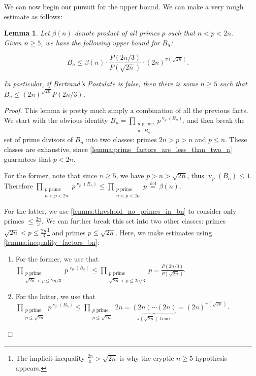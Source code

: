 \documentclass[11pt]{article}
\newtheorem{lemma}[theorem]{Lemma}
\theoremstyle{remark}
\newcommand{\vs}{\vspace{10px}}
\DeclareMathOperator{\val}{v}
\DeclareMathOperator{\vv}{v}
\begin{document}
We can now begin our pursuit for the upper bound. We can make a very rough estimate as follows:

\begin{lemma} \label{lemma:upper_bound_bn}
    Let $\beta(n)$ denote product of all primes $p$ such that $n<p<2n$. Given $n\ge 5$, we have the following upper bound for $B_n$: 

    \[B_n\le \beta(n)\cdot \frac{P(2n/3)}{P(\sqrt{2n})}\cdot  (2n)^{\pi(\sqrt{2n})}.\]

    In particular, if Bertrand's Postulate is false, then there is some $n\ge 5$ such that $B_n\le (2n)^{\sqrt{2n}}P(2n/3)$.
\end{lemma}\vs

\begin{proof}
This lemma is pretty much simply a combination of all the previous facts. We start with the obvious identity $B_n = \prod\limits_{\substack{p\text{ prime}\\p\mid B_n}} p^{\vv_p(B_n)}$, and then break the set of prime divisors of $B_n$ into two classes: primes $2n>p >n$ and  $p \le n$. These classes are exhaustive, since \ref{lemma:prime_factors_are_less_than_two_n} guarantees that $p<2n$.\vs

For the former, note that since $n\ge 5$, we have $p>n> \sqrt{2n}$, thus $\vv_p(B_n)\le 1$. Therefore $\prod\limits_{\substack{p\text{ prime }\\n<p<2n}}p^{\vv_p(B_n)}\le \prod\limits_{\substack{p\text{ prime }\\n<p<2n}}p\,\stackrel{\textrm{def}}{=}\, \beta(n)$.

For the latter, we use \ref{lemma:threshold_no_primes_in_bn} to consider only primes $\le \frac{2n}{3}$. We can further break this set into two other classes: primes $\sqrt{2n}<p\le \frac{2n}{3}$\footnote{The implicit inequality $\frac{2n}{3}>\sqrt{2n}$ is why the cryptic $n\ge 5$ hypothesis appears.} and primes $p\le \sqrt{2n}$. Here, we make estimates using \ref{lemma:inequality_factors_bn}:

\begin{enumerate}
    \item For the former, we use that $\prod\limits_{\substack{p\text{ prime }\\ \sqrt{2n}<p \le 2n/3}} p^{\val_p(B_n)}\le \prod\limits_{\substack{p\text{ prime }\\ \sqrt{2n}<p \le 2n/3}} p = \frac{P(2n/3)}{P(\sqrt{2n})}$.
    \item For the latter, we use that $\prod\limits_{\substack{p\text{ prime }\\p \le \sqrt{2n}}} p^{\val_p(B_n)}\le\prod\limits_{\substack{p\text{ prime }\\p \le \sqrt{2n}}}2n = \underbrace{(2n)\cdots (2n)}_{\pi(\sqrt{2n})\text{ times}} = (2n)^{\pi(\sqrt{2n})}$.
\end{enumerate}


\end{proof}
\end{document}
